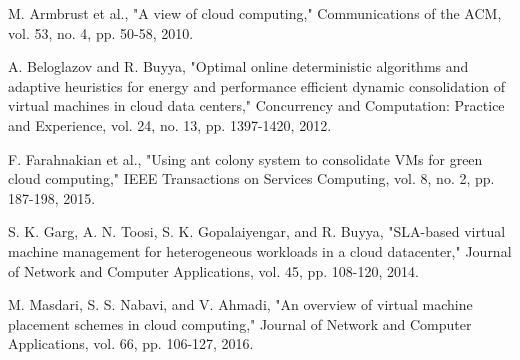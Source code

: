 \documentclass[10pt,conference]{IEEEtran}
\begin{document}
\begin{thebibliography}{99}

M. Armbrust et al., "A view of cloud computing," Communications of the ACM, vol. 53, no. 4, pp. 50-58, 2010.

A. Beloglazov and R. Buyya, "Optimal online deterministic algorithms and adaptive heuristics for energy and performance efficient dynamic consolidation of virtual machines in cloud data centers," Concurrency and Computation: Practice and Experience, vol. 24, no. 13, pp. 1397-1420, 2012.

F. Farahnakian et al., "Using ant colony system to consolidate VMs for green cloud computing," IEEE Transactions on Services Computing, vol. 8, no. 2, pp. 187-198, 2015.

S. K. Garg, A. N. Toosi, S. K. Gopalaiyengar, and R. Buyya, "SLA-based virtual machine management for heterogeneous workloads in a cloud datacenter," Journal of Network and Computer Applications, vol. 45, pp. 108-120, 2014.

M. Masdari, S. S. Nabavi, and V. Ahmadi, "An overview of virtual machine placement schemes in cloud computing," Journal of Network and Computer Applications, vol. 66, pp. 106-127, 2016.


\end{thebibliography}
\end{document}
